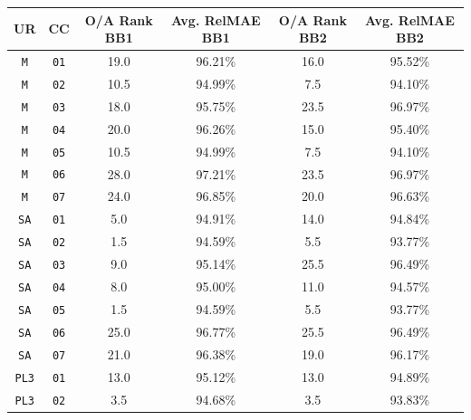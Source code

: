 \documentclass[10pt,a4paper,oneside]{article}
\begin{document}
\begin{table}[htb]
    \centering
    \begin{tabular}{@{}cccccc@{}}
        \toprule
        UR           & CC        & O/A Rank BB1 & Avg. RelMAE BB1 & O/A Rank BB2 & Avg. RelMAE BB2 \\ \midrule
        \verb|M|     & \verb|01| & 19.0         & 96.21\%         & 16.0         & 95.52\%         \\
        \verb|M|     & \verb|02| & 10.5         & 94.99\%         & 7.5          & 94.10\%         \\
        \verb|M|     & \verb|03| & 18.0         & 95.75\%         & 23.5         & 96.97\%         \\
        \verb|M|     & \verb|04| & 20.0         & 96.26\%         & 15.0         & 95.40\%         \\
        \verb|M|     & \verb|05| & 10.5         & 94.99\%         & 7.5          & 94.10\%         \\
        \verb|M|     & \verb|06| & 28.0         & 97.21\%         & 23.5         & 96.97\%         \\
        \verb|M|     & \verb|07| & 24.0         & 96.85\%         & 20.0         & 96.63\%         \\
        \verb|SA|    & \verb|01| & 5.0          & 94.91\%         & 14.0         & 94.84\%         \\
        \verb|SA|    & \verb|02| & 1.5          & 94.59\%         & 5.5          & 93.77\%         \\
        \verb|SA|    & \verb|03| & 9.0          & 95.14\%         & 25.5         & 96.49\%         \\
        \verb|SA|    & \verb|04| & 8.0          & 95.00\%         & 11.0         & 94.57\%         \\
        \verb|SA|    & \verb|05| & 1.5          & 94.59\%         & 5.5          & 93.77\%         \\
        \verb|SA|    & \verb|06| & 25.0         & 96.77\%         & 25.5         & 96.49\%         \\
        \verb|SA|    & \verb|07| & 21.0         & 96.38\%         & 19.0         & 96.17\%         \\
        \verb|PL3|   & \verb|01| & 13.0         & 95.12\%         & 13.0         & 94.89\%         \\
        \verb|PL3|   & \verb|02| & 3.5          & 94.68\%         & 3.5          & 93.83\%         \\

\end{tabular}
\end{table}
\end{document}
